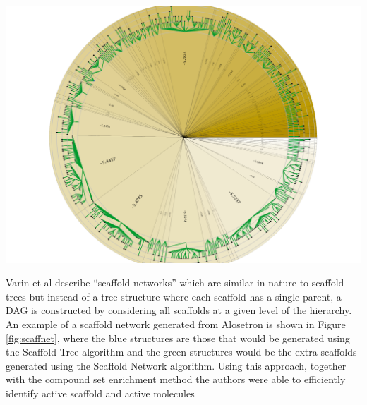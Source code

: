 \documentclass[12pt,letterpaper]{article}
\begin{document}
{}
{\includegraphics[width=\linewidth]{img/scafftree-full}}

Varin et al \cite{Varin:2011ve} describe ``scaffold networks'' which
are similar in nature to scaffold trees but instead of a tree
structure where each scaffold has a single parent, a DAG is
constructed by considering all scaffolds at a given level of the
hierarchy. An example of a scaffold network generated from Alosetron
is shown in Figure \ref{fig:scaffnet}, where the blue structures are
those that would be generated using the Scaffold Tree algorithm and
the green structures would be the extra scaffolds generated using the
Scaffold Network algorithm. Using this approach, together with the
compound set enrichment method \cite{Varin:2010zh} the authors were
able to efficiently identify active scaffold and active molecules
\end{document}
